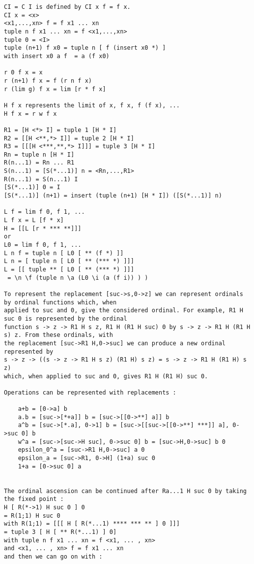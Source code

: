 \documentclass[10pt]{article}
\begin{document}
\begin{verbatim}
CI = C I is defined by CI x f = f x.
CI x = <x>
<x1,...,xn> f = f x1 ... xn
tuple n f x1 ... xn = f <x1,...,xn>
tuple 0 = <I>
tuple (n+1) f x0 = tuple n [ f (insert x0 *) ]
with insert x0 a f  = a (f x0)

r 0 f x = x
r (n+1) f x = f (r n f x)
r (lim g) f x = lim [r * f x]

H f x represents the limit of x, f x, f (f x), ...
H f x = r w f x

R1 = [H <*> I] = tuple 1 [H * I]
R2 = [[H <**,*> I]] = tuple 2 [H * I]
R3 = [[[H <***,**,*> I]]] = tuple 3 [H * I]
Rn = tuple n [H * I]
R(n...1) = Rn ... R1
S(n...1) = [S(*...1)] n = <Rn,...,R1>
R(n...1) = S(n...1) I
[S(*...1)] 0 = I
[S(*...1)] (n+1) = insert (tuple (n+1) [H * I]) ([S(*...1)] n)

L f = lim f 0, f 1, ...
L f x = L [f * x]
H = [[L [r * *** **]]]
or
L0 = lim f 0, f 1, ...
L n f = tuple n [ L0 [ ** (f *) ]]
L n = [ tuple n [ L0 [ ** (*** *) ]]]
L = [[ tuple ** [ L0 [ ** (*** *) ]]]
 = \n \f (tuple n \a (L0 \i (a (f i)) ) )
 
To represent the replacement [suc->s,0->z] we can represent ordinals by ordinal functions which, when 
applied to suc and 0, give the considered ordinal. For example, R1 H suc 0 is represented by the ordinal 
function s -> z -> R1 H s z, R1 H (R1 H suc) 0 by s -> z -> R1 H (R1 H s) z. From these ordinals, with 
the replacement [suc->R1 H,0->suc] we can produce a new ordinal represented by 
s -> z -> ((s -> z -> R1 H s z) (R1 H) s z) = s -> z -> R1 H (R1 H) s z) 
which, when applied to suc and 0, gives R1 H (R1 H) suc 0.

Operations can be represented with replacements :

    a+b = [0->a] b
    a.b = [suc->[*+a]] b = [suc->[[0->**] a]] b
    a^b = [suc->[*.a], 0->1] b = [suc->[[suc->[[0->**] ***]] a], 0->suc 0] b
    w^a = [suc->[suc->H suc], 0->suc 0] b = [suc->H,0->suc] b 0
    epsilon_0^a = [suc->R1 H,0->suc] a 0
    epsilon_a = [suc->R1, 0->H] (1+a) suc 0
    1+a = [0->suc 0] a 


The ordinal ascension can be continued after Ra...1 H suc 0 by taking the fixed point :
H [ R(*->1) H suc 0 ] 0
= R(1;1) H suc 0
with R(1;1) = [[[ H [ R(*...1) **** *** ** ] 0 ]]]
= tuple 3 [ H [ ** R(*...1) ] 0]
with tuple n f x1 ... xn = f <x1, ... , xn>
and <x1, ... , xn> f = f x1 ... xn
and then we can go on with :


\end{verbatim}
\end{document}
